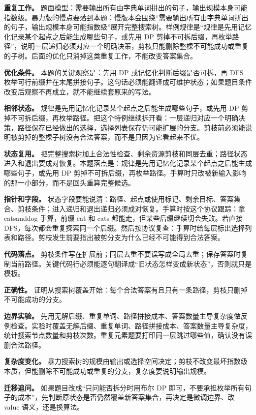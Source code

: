 \textbf{重复工作。} 题面模型：需要输出所有由字典单词拼出的句子，输出规模本身可能指数级。暴力版的慢点要落到本题：慢版本会围绕“需要输出所有由字典单词拼出的句子，输出规模本身可能指数级”展开完整搜索树。样例规律是“规律是先用记忆化记录某个起点之后能生成哪些句子，或先用 DP 剪掉不可拆后缀，再枚举路径”，说明一层递归必须对应一个明确决策，剪枝只能删除整棵不可能成功或重复的子树。后面的优化只消掉这类重复工作，不能改变答案集合。

\textbf{优化条件。} 本题的关键观察是：先用 DP 或记忆化判断后缀是否可拆，再 DFS 枚举可行前缀并在末尾拼接句子。这句话必须能翻译成可维护状态；如果题目条件改变后观察不再成立，就不能继续套原来的写法。

\textbf{相邻状态。} 规律是先用记忆化记录某个起点之后能生成哪些句子，或先用 DP 剪掉不可拆后缀，再枚举路径。把这个特例继续拆开看：一层递归对应一个明确决策，路径保存已经做出的选择，选择列表保存仍可能扩展的分支。剪枝前必须能说明被剪掉的整棵子树没有合法答案，而不是只因为它看起来不优。

\textbf{状态复用。} 把完整搜索树加上合法性检查、剩余资源剪枝和同层去重；路径状态进入和退出要成对恢复。本题落点是：规律是先用记忆化记录某个起点之后能生成哪些句子，或先用 DP 剪掉不可拆后缀，再枚举路径。手算时只改被新输入影响的那一小部分，而不是回头重算完整候选。

\textbf{指针和字段。} 状态字段要能说清：路径、起点或使用标记、剩余目标、答案集合、剪枝条件；进入递归和退出递归必须成对恢复。手算时按这个协议跟踪：拿 catsanddog 手算，前缀 cat 和 cats 都能走，但某些后缀继续切会失败。若直接 DFS，每次都会重复探索同一个后缀。然后按协议复查：手算时给每层标出选择列表和路径。剪枝发生前要指出被剪分支为什么已经不可能得到合法答案。

\textbf{代码落点。} 剪枝条件写在扩展前；同层去重不要误写成全局去重；保存答案时复制当前路径。关键代码行必须能逐句翻译成“旧状态怎样变成新状态”，否则就只是模板。

\textbf{正确性。} 证明从搜索树覆盖开始：每个合法答案有且只有一条路径，剪枝只删掉不可能成功的分支。

\textbf{边界实验。} 先用无解后缀、重复单词、路径拼接成本、答案数量主导复杂度做反例检查。实验时覆盖无解后缀、重复单词、路径拼接成本、答案数量主导复杂度，统计搜索节点数量和剪枝次数。重复元素题要打印同一层跳过哪些值，确认没有误删合法路径。

\textbf{复杂度变化。} 暴力搜索树的规模由输出或选择空间决定；剪枝不改变最坏指数级本质，但能删除不可能成功或重复的分支，复杂度要说明输出规模。

\textbf{迁移追问。} 如果题目改成“只问能否拆分时用布尔 DP 即可，不要承担枚举所有句子的成本”，先判断原状态是否仍然覆盖新答案集合，再决定是微调边界、改 value 语义，还是换算法。

